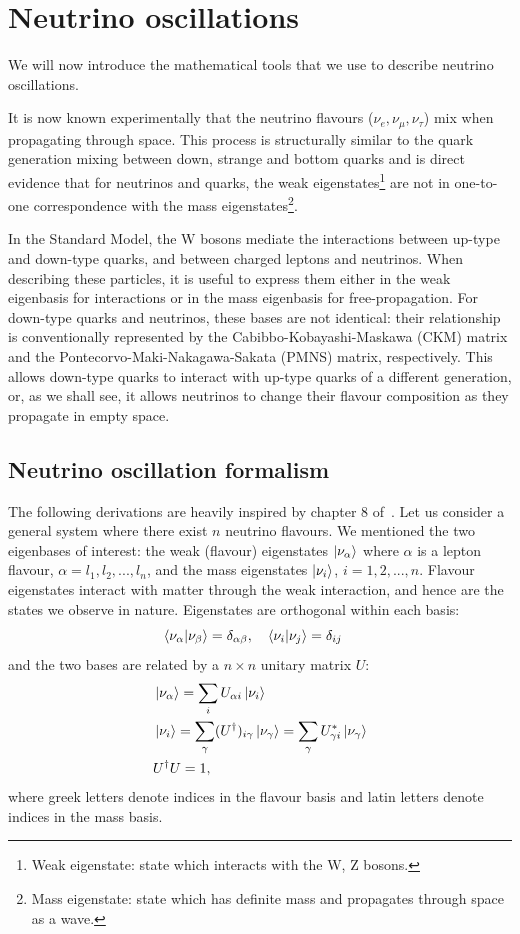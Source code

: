 \section{Neutrino oscillations}
We will now introduce the mathematical tools that we use to describe neutrino
oscillations. 

It is now known experimentally that 
the neutrino flavours ($\nu_e, \nu_\mu, \nu_\tau$) mix when propagating through
space\cite{superk}. This process is structurally similar to the quark generation
mixing between down, strange and bottom quarks\cite{pdg_ckm}
and is direct evidence that for neutrinos and quarks, the weak
eigenstates\footnote{Weak eigenstate: state which interacts with the W, Z
bosons.} are not in one-to-one correspondence with the mass
eigenstates\footnote{Mass eigenstate: state which has definite mass and
propagates through space as a wave.}.

In the Standard Model, the W bosons mediate the interactions between up-type and
down-type quarks, and between charged leptons and neutrinos. 
When describing these particles, it is useful to express them either in the
weak eigenbasis for interactions or in the mass eigenbasis for
free-propagation.
For down-type quarks and neutrinos, these bases are not identical: their
relationship is conventionally represented by the Cabibbo-Kobayashi-Maskawa
(CKM) matrix and the Pontecorvo-Maki-Nakagawa-Sakata (PMNS) matrix,
respectively.  This allows down-type quarks to interact with up-type quarks of
a different generation, or, as we shall see, it allows neutrinos to change their
flavour composition as they propagate in empty space.


\subsection{Neutrino oscillation formalism} 
The following derivations are heavily inspired by chapter 8 of~\cite{zuber}.
Let us consider a general system where there exist $n$ neutrino flavours. 
We mentioned the two eigenbases of interest: the weak (flavour)
eigenstates $\ket{\nu_{\alpha}}$ where $\alpha$ is a lepton flavour,
$\alpha=l_1, l_2, ..., l_n$, and the mass eigenstates $\ket{\nu_i}$, $i=1, 2,
..., n$. 
Flavour eigenstates interact with matter through the weak interaction, and
hence are the states we observe in nature. Eigenstates are orthogonal within
each basis:
$$
\bra{\nu_\alpha}\ket{\nu_\beta} = \delta_{\alpha \beta}, \quad
	\bra{\nu_i}\ket{\nu_j} = \delta_{ij}  \quad
$$
and the two bases are related by a $n\times n$ unitary matrix $U$:
\begin{align}
	&\ket{\nu_\alpha} = \sum_i U_{\alpha i} \ket{\nu_i}\label{eq:bases1}\\
	&\ket{\nu_i} = \sum_\gamma (U^\dagger)_{i \gamma} \ket{\nu_\gamma} = \sum_\gamma
			U^*_{\gamma i} \ket{\nu_\gamma}\label{eq:bases2}\\
	&U^\dagger U = 1, \nonumber
\end{align}
where greek letters denote indices in the flavour basis and latin letters
denote indices in the mass basis.


